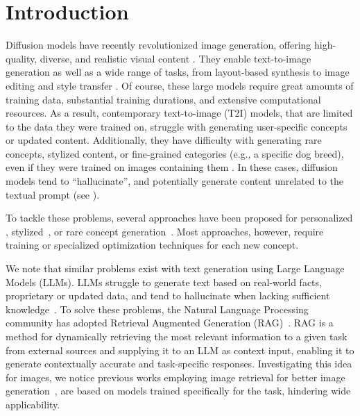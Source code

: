 \section{Introduction}
\label{sec:intro}

Diffusion models \cite{ho2020denoising} have recently revolutionized image generation, offering high-quality, diverse, and realistic visual content \cite{dhariwal2021diffusion, rombach2022high}.
They enable text-to-image generation as well as a wide range of tasks, from layout-based synthesis to image editing and style transfer \cite{avrahami2022blended, hertz2022prompt, mokady2023null, avrahami2023spatext, zhang2023adding, brooks2023instructpix2pix, nitzan2024lazy}.
Of course, these large models require great amounts of training data, substantial training durations, and extensive computational resources.
As a result, contemporary text-to-image (T2I) models, that are limited to the data they were trained on, struggle with generating user-specific concepts or updated content.
Additionally, they have difficulty with generating rare concepts, stylized content, or fine-grained categories (e.g., a specific dog breed), even if they were trained on images containing them \cite{samuel2024generating,haviv2024not}.
In these cases, diffusion models tend to ``hallucinate'', and potentially generate content unrelated to the textual prompt (see ).

To tackle these problems, several approaches have been proposed for personalized 
\cite{galimage, ruiz2023dreambooth, voynov2023p+, arar2024palp}, stylized~\cite{hulora},  or rare concept generation~\cite{li2024block, samuel2024generating}. 
Most approaches, however, require training or specialized optimization techniques for each new concept.

We note  that similar problems exist with text generation using Large Language Models (LLMs). 
LLMs struggle to generate text based on real-world facts, proprietary or updated data, and tend to hallucinate when lacking sufficient knowledge~\cite{brown2020language, ji2023survey}. 
To solve these problems, the Natural Language Processing community has adopted Retrieval Augmented Generation (RAG)~\cite{lewis2020retrieval}. RAG is a method for dynamically retrieving the most relevant information to a given task from external sources and supplying it to an LLM as context input, enabling it to generate contextually accurate and task-specific responses.
Investigating this idea for images, we notice previous works employing image retrieval for better image generation~\cite{chenre, sheyninknn, blattmann2022retrieval, hu2024instruct}, are based on models trained specifically for the task, hindering wide applicability.


